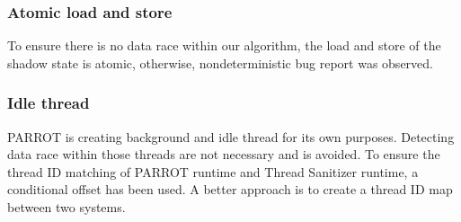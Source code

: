 \subsubsection{Atomic load and store}
To ensure there is no data race within our algorithm, the load and store of the shadow state is atomic, otherwise, nondeterministic bug report
was observed.
\subsubsection{Idle thread}
PARROT is creating background and idle thread for its own purposes. Detecting data race within those threads are not necessary and is avoided.
To ensure the thread ID matching of PARROT runtime and Thread Sanitizer runtime, a conditional offset has been used. A better approach 
is to create a thread ID map between two systems.
